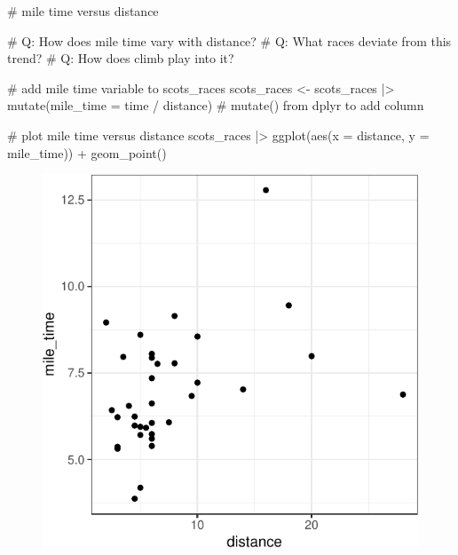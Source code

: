 \documentclass[
  11pt,
  letterpaper,
  oneside]{book}
\newenvironment{Shaded}{\begin{snugshade}}{\end{snugshade}}
\newcommand{\AttributeTok}[1]{\textcolor[rgb]{0.40,0.45,0.13}{#1}}
\newcommand{\CommentTok}[1]{\textcolor[rgb]{0.37,0.37,0.37}{#1}}
\newcommand{\FunctionTok}[1]{\textcolor[rgb]{0.28,0.35,0.67}{#1}}
\newcommand{\NormalTok}[1]{\textcolor[rgb]{0.00,0.23,0.31}{#1}}
\newcommand{\OtherTok}[1]{\textcolor[rgb]{0.00,0.23,0.31}{#1}}
\newcommand{\SpecialCharTok}[1]{\textcolor[rgb]{0.37,0.37,0.37}{#1}}
\theoremstyle{plain}
\theoremstyle{plain}
\theoremstyle{definition}
\theoremstyle{definition}
\theoremstyle{plain}
\theoremstyle{remark}
\begin{document}
\begin{Shaded}
\begin{Highlighting}[]
\CommentTok{\# mile time versus distance}

\CommentTok{\# Q: How does mile time vary with distance?}
\CommentTok{\# Q: What races deviate from this trend?}
\CommentTok{\# Q: How does climb play into it?}

\CommentTok{\# add mile time variable to scots\_races}
\NormalTok{scots\_races }\OtherTok{\textless{}{-}}\NormalTok{ scots\_races }\SpecialCharTok{|\textgreater{}}
  \FunctionTok{mutate}\NormalTok{(}\AttributeTok{mile\_time =}\NormalTok{ time }\SpecialCharTok{/}\NormalTok{ distance) }\CommentTok{\# mutate() from dplyr to add column}
\end{Highlighting}
\end{Shaded}

\begin{Shaded}
\begin{Highlighting}[]
\CommentTok{\# plot mile time versus distance}
\NormalTok{scots\_races }\SpecialCharTok{|\textgreater{}}
  \FunctionTok{ggplot}\NormalTok{(}\FunctionTok{aes}\NormalTok{(}\AttributeTok{x =}\NormalTok{ distance, }\AttributeTok{y =}\NormalTok{ mile\_time)) }\SpecialCharTok{+}
  \FunctionTok{geom\_point}\NormalTok{()}
\end{Highlighting}
\end{Shaded}

\begin{figure}[H]

{\centering \includegraphics{r-demo-part-1_files/figure-pdf/unnamed-chunk-5-1.pdf}

}

\end{figure}
\end{document}
